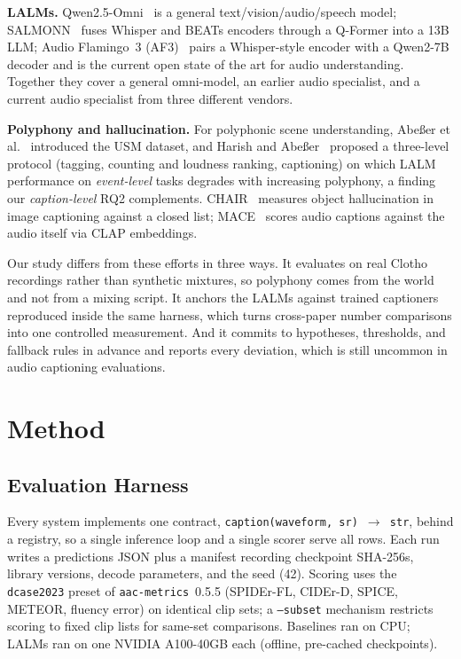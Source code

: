 \documentclass[conference]{IEEEtran}
\begin{document}
\textbf{LALMs.} Qwen2.5-Omni~\cite{xu2025qwenomni} is a general
text/vision/audio/speech model; SALMONN~\cite{tang2024salmonn} fuses Whisper
and BEATs encoders through a Q-Former into a 13B LLM; Audio Flamingo~3
(AF3)~\cite{goel2025af3} pairs a Whisper-style encoder with a Qwen2-7B decoder
and is the current open state of the art for audio understanding. Together
they cover a general omni-model, an earlier audio specialist, and a current
audio specialist from three different vendors.

\textbf{Polyphony and hallucination.} For polyphonic scene understanding,
Abe{\ss}er et al.~\cite{abesser2023usm} introduced the USM dataset, and Harish
and Abe{\ss}er~\cite{harish2025dcase} proposed a three-level protocol (tagging,
counting and loudness ranking, captioning) on which LALM performance on
\emph{event-level} tasks degrades with increasing polyphony, a finding our
\emph{caption-level} RQ2 complements. CHAIR~\cite{rohrbach2018chair} measures
object hallucination in image captioning against a closed list;
MACE~\cite{dixit2024mace} scores audio captions against the audio itself via
CLAP embeddings.

Our study differs from these efforts in three ways. It evaluates on real
Clotho recordings rather than synthetic mixtures, so polyphony comes from the
world and not from a mixing script. It anchors the LALMs against trained
captioners reproduced inside the same harness, which turns cross-paper number
comparisons into one controlled measurement. And it commits to hypotheses,
thresholds, and fallback rules in advance and reports every deviation, which
is still uncommon in audio captioning evaluations.

\section{Method}\label{sec:method}
\subsection{Evaluation Harness}
Every system implements one contract, \texttt{caption(waveform, sr)
$\rightarrow$ str}, behind a registry, so a single inference loop and a
single scorer serve all rows. Each run writes a predictions JSON plus a
manifest recording checkpoint SHA-256s, library versions, decode parameters,
and the seed (42). Scoring uses the \texttt{dcase2023} preset of
\texttt{aac-metrics}~0.5.5 (SPIDEr-FL, CIDEr-D, SPICE, METEOR, fluency error)
on identical clip sets; a \texttt{--subset} mechanism restricts scoring to
fixed clip lists for same-set comparisons. Baselines ran on CPU; LALMs ran on
one NVIDIA A100-40GB each (offline, pre-cached checkpoints).
\end{document}
